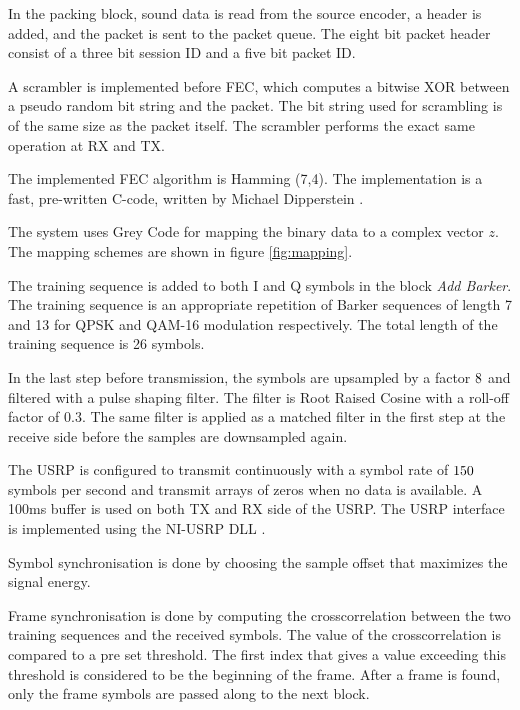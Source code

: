 In the packing block, sound data is read from the source encoder, a header is added, and the packet is sent to the packet queue. The eight bit packet header consist of a three bit session ID and a five bit packet ID. 

A scrambler is implemented before FEC, which computes a bitwise XOR between a pseudo random bit string and the packet. The bit string used for scrambling is of the same size as the packet itself. The scrambler performs the exact same operation at RX and TX.

The implemented FEC algorithm is Hamming (7,4). The implementation is a fast, pre-written C-code, written by Michael Dipperstein \cite{hamming}. 

The system uses Grey Code for mapping the binary data to a complex vector $z$. The mapping schemes are shown in figure \ref{fig:mapping}.



The training sequence is added to both I and Q symbols in the block \textit{Add Barker}. The training sequence is an appropriate repetition of Barker sequences of length 7 and 13 for QPSK and QAM-16 modulation respectively. The total length of the training sequence is 26 symbols. 

In the last step before transmission, the symbols are upsampled by a factor $8$ and filtered with a pulse shaping filter. The filter is Root Raised Cosine with a roll-off factor of 0.3. The same filter is applied as a matched filter in the first step at the receive side before the samples are downsampled again. 

The USRP is configured to transmit continuously with a symbol rate of $150$ symbols per second and transmit arrays of zeros when no data is available. A 100ms buffer is used on both TX and RX side of the USRP. The USRP interface is implemented using the NI-USRP DLL \cite{labviewDLL}.

Symbol synchronisation is done by choosing the sample offset that maximizes the signal energy. 

Frame synchronisation is done by computing the crosscorrelation between the two training sequences and the received symbols. The value of the crosscorrelation is compared to a pre set threshold. The first index that gives a value exceeding this threshold is considered to be the beginning of the frame. After a frame is found, only the frame symbols are passed along to the next block.

